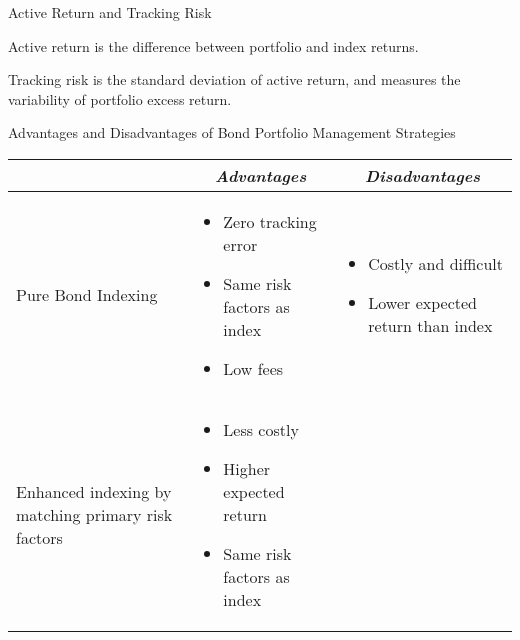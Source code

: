 \documentclass[../custom]{flashcards}
\begin{document}

\begin{flashcard}{Active Return and Tracking Risk}
    \begin{flushleft}
        Active return is the difference between portfolio and index returns.\newline

        Tracking risk is the standard deviation of active return, and measures the variability of portfolio excess return.
    \end{flushleft}
\end{flashcard}

\begin{flashcard}{Advantages and Disadvantages of Bond Portfolio Management Strategies}
    \begin{tabular}{>{\raggedright}p{1in} p{1.6in}  p{1.6in}} \toprule
        \multicolumn{1}{c}{\textit{Strategy}} &
        \multicolumn{1}{c}{\textit{Advantages}} &
        \multicolumn{1}{c}{\textit{Disadvantages}}
        \\ \midrule
        Pure Bond Indexing &
        \vspace{-3mm}
        \begin{itemize}[nosep,leftmargin=*]
            \item Zero tracking error
            \item Same risk factors as index
            \item Low fees 
            \vspace*{-\baselineskip}
        \end{itemize} &
        \vspace{-3mm}
        \begin{itemize}[nosep,leftmargin=*]
            \item Costly and difficult
            \item Lower expected return than index
            \vspace*{-\baselineskip}
        \end{itemize}
        \\ \midrule
        Enhanced indexing by matching primary risk factors &
        \vspace{-3mm}
        \begin{itemize}[nosep,leftmargin=*]
            \item Less costly
            \item Higher expected return
            \item Same risk factors as index

\end{itemize}
\end{tabular}
\end{flashcard}
\end{document}
